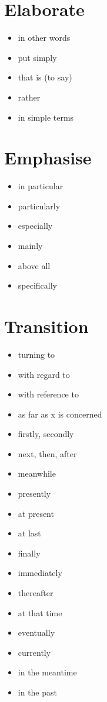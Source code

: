 \documentclass[twocolumn, a4paper]{article}
\begin{document}
\section{Elaborate}
{\color{ForestGreen}
	\begin{itemize}[leftmargin=*, noitemsep]
		\item in other words
		\item put simply
		\item that is (to say)
		\item rather
		\item in simple terms
	\end{itemize}
}

\section{Emphasise}
{\color{myLightBlue}
	\begin{itemize}[leftmargin=*, noitemsep]
		\item in particular
		\item particularly
		\item especially
		\item mainly
		\item above all
		\item specifically
	\end{itemize}
}

\section{Transition}
{\color{NavyBlue}
	\begin{itemize}[leftmargin=*, noitemsep]
		\item turning to
		\item with regard to
		\item with reference to
		\item as far as x is concerned
		\item firstly, secondly
		\item next, then, after
		\item meanwhile
		\item presently
		\item at present
		\item at last
		\item finally
		\item immediately
		\item thereafter
		\item at that time
		\item eventually
		\item currently
		\item in the meantime
		\item in the past
	\end{itemize}
}
\end{document}
